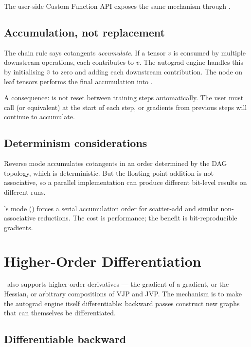 The user-side Custom Function API exposes the same mechanism
through .

\subsection{Accumulation, not replacement}
\label{ssec:ad_theory:accumulation}

The chain rule says cotangents \emph{accumulate}. If a tensor $v$
is consumed by multiple downstream operations, each contributes
to $\bar{v}$. The autograd engine handles this by initialising
$\bar{v}$ to zero and adding each downstream contribution. The
 node on leaf tensors performs the final
accumulation into .

A consequence:  is not reset between training
steps automatically. The user must call
 (or equivalent) at the start of
each step, or gradients from previous steps will continue to
accumulate.

\subsection{Determinism considerations}
\label{ssec:ad_theory:determinism}

Reverse mode accumulates cotangents in an order determined by the
DAG topology, which is deterministic. But the floating-point
addition is not associative, so a parallel implementation can
produce different bit-level results on different runs.

\Lucid's  mode
() forces a serial accumulation order
for scatter-add and similar non-associative reductions. The cost
is performance; the benefit is bit-reproducible gradients.

\section{Higher-Order Differentiation}
\label{sec:ad_theory:higher_order}

\Lucid\ also supports higher-order derivatives --- the gradient of
a gradient, or the Hessian, or arbitrary compositions of VJP and
JVP. The mechanism is to make the autograd engine itself
differentiable: backward passes construct new graphs that can
themselves be differentiated.

\subsection{Differentiable backward}
\label{ssec:ad_theory:diff_back}

